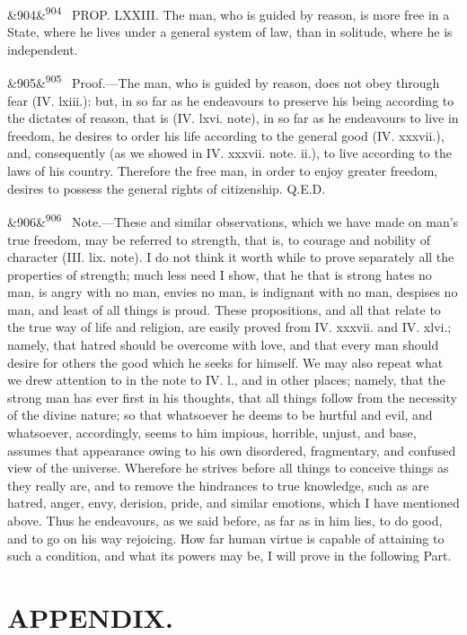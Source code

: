 \documentclass[12pt]{article}
\newcommand{\para}[1][]{\par\noindent\ifx&#1&\else\textsuperscript{\footnotesize #1}~\fi}
\begin{document}
\para[904] PROP. LXXIII. The man, who is guided by reason, is more free in a State, where he lives under a general system of law, than in solitude, where he is independent.

\para[905] Proof.---The man, who is guided by reason, does not obey through fear (IV. lxiii.): but, in so far as he endeavours to preserve his being according to the dictates of reason, that is (IV. lxvi. note), in so far as he endeavours to live in freedom, he desires to order his life according to the general good (IV. xxxvii.), and, consequently (as we showed in IV. xxxvii. note. ii.), to live according to the laws of his country. Therefore the free man, in order to enjoy greater freedom, desires to possess the general rights of citizenship. Q.E.D.

\para[906] Note.---These and similar observations, which we have made on man's true freedom, may be referred to strength, that is, to courage and nobility of character (III. lix. note). I do not think it worth while to prove separately all the properties of strength; much less need I show, that he that is strong hates no man, is angry with no man, envies no man, is indignant with no man, despises no man, and least of all things is proud. These propositions, and all that relate to the true way of life and religion, are easily proved from IV. xxxvii. and IV. xlvi.; namely, that hatred should be overcome with love, and that every man should desire for others the good which he seeks for himself. We may also repeat what we drew attention to in the note to IV. l., and in other places; namely, that the strong man has ever first in his thoughts, that all things follow from the necessity of the divine nature; so that whatsoever he deems to be hurtful and evil, and whatsoever, accordingly, seems to him impious, horrible, unjust, and base, assumes that appearance owing to his own disordered, fragmentary, and confused view of the universe. Wherefore he strives before all things to conceive things as they really are, and to remove the hindrances to true knowledge, such as are hatred, anger, envy, derision, pride, and similar emotions, which I have mentioned above. Thus he endeavours, as we said before, as far as in him lies, to do good, and to go on his way rejoicing. How far human virtue is capable of attaining to such a condition, and what its powers may be, I will prove in the following Part.

\section*{APPENDIX.}
\end{document}
